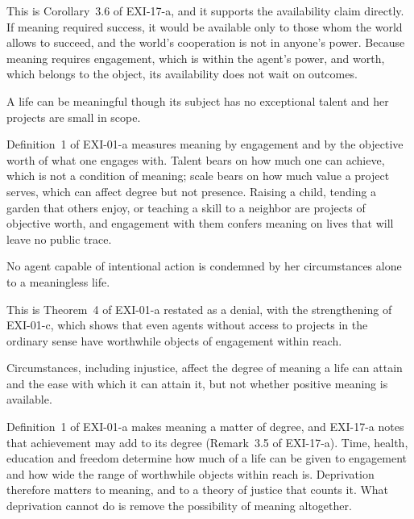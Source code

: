 \documentclass{situationist-preprint}
\begin{document}
This is Corollary~3.6 of EXI-17-a, and it supports the availability claim directly. If meaning required success, it would be available only to those whom the world allows to succeed, and the world's cooperation is not in anyone's power. Because meaning requires engagement, which is within the agent's power, and worth, which belongs to the object, its availability does not wait on outcomes.

\begin{proposition}\label{p:talent}
A life can be meaningful though its subject has no exceptional talent and her projects are small in scope.
\end{proposition}

Definition~1 of EXI-01-a measures meaning by engagement and by the objective worth of what one engages with. Talent bears on how much one can achieve, which is not a condition of meaning; scale bears on how much value a project serves, which can affect degree but not presence. Raising a child, tending a garden that others enjoy, or teaching a skill to a neighbor are projects of objective worth, and engagement with them confers meaning on lives that will leave no public trace.

\begin{proposition}\label{p:circ}
No agent capable of intentional action is condemned by her circumstances alone to a meaningless life.
\end{proposition}

This is Theorem~4 of EXI-01-a restated as a denial, with the strengthening of EXI-01-c, which shows that even agents without access to projects in the ordinary sense have worthwhile objects of engagement within reach.

\begin{proposition}\label{p:degree}
Circumstances, including injustice, affect the degree of meaning a life can attain and the ease with which it can attain it, but not whether positive meaning is available.
\end{proposition}

Definition~1 of EXI-01-a makes meaning a matter of degree, and EXI-17-a notes that achievement may add to its degree (Remark~3.5 of EXI-17-a). Time, health, education and freedom determine how much of a life can be given to engagement and how wide the range of worthwhile objects within reach is. Deprivation therefore matters to meaning, and to a theory of justice that counts it. What deprivation cannot do is remove the possibility of meaning altogether.
\end{document}
